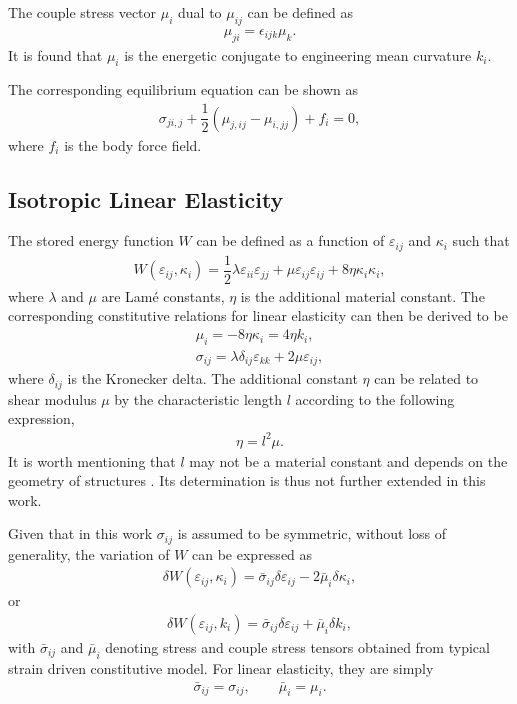 \documentclass[3p,sort&compress,11pt,fleqn,review]{elsarticle}
\begin{document}
The couple stress vector $\mu_i$ dual to $\mu_{ij}$ can be defined as
\begin{gather}
\mu_{ji}=\epsilon_{ijk}\mu_k.
\end{gather}
It is found that $\mu_i$ is the energetic conjugate to engineering mean curvature $k_i$.

The corresponding equilibrium equation can be shown as
\begin{gather}\label{eq:equilibrium}
\sigma_{ji,j}+\dfrac{1}{2}\left(\mu_{j,ij}-\mu_{i,jj}\right)+f_i=0,
\end{gather}
where $f_i$ is the body force field.
\subsection{Isotropic Linear Elasticity}
The stored energy function $W$ can be defined as a function of $\varepsilon_{ij}$ and $\kappa_i$ such that
\begin{gather}\label{eq:stored_energy}
W\left(\varepsilon_{ij},\kappa_i\right)=\dfrac{1}{2}\lambda\varepsilon_{ii}\varepsilon_{jj}+\mu\varepsilon_{ij}\varepsilon_{ij}+8\eta\kappa_i\kappa_i,
\end{gather}
where $\lambda$ and $\mu$ are Lam\'{e} constants, $\eta$ is the additional material constant. The corresponding constitutive relations for linear elasticity can then be derived to be
\begin{gather}\label{eq:constitutive_couple}
\mu_i=-8\eta\kappa_i=4\eta{}k_i,\\
\sigma_{ij}=\lambda\delta_{ij}\varepsilon_{kk}+2\mu\varepsilon_{ij},
\end{gather}
where $\delta_{ij}$ is the Kronecker delta. The additional constant $\eta$ can be related to shear modulus $\mu$ by the characteristic length $l$ according to the following expression,
\begin{gather}
\eta=l^2\mu.
\end{gather}
It is worth mentioning that $l$ may not be a material constant and depends on the geometry of structures \citep{Khorshidi2018}. Its determination is thus not further extended in this work.

Given that in this work $\sigma_{ij}$ is assumed to be symmetric, without loss of generality, the variation of $W$ can be expressed as
\begin{gather}\label{eq:potential_energy}
\delta{}W\left(\varepsilon_{ij},\kappa_i\right)=\bar{\sigma}_{ij}\delta\varepsilon_{ij}-2\bar{\mu}_{i}\delta\kappa_i,
\end{gather}
or
\begin{gather}
\delta{}W\left(\varepsilon_{ij},k_i\right)=\bar{\sigma}_{ij}\delta\varepsilon_{ij}+\bar{\mu}_{i}\delta{}k_i,
\end{gather}
with $\bar{\sigma}_{ij}$ and $\bar{\mu}_{i}$ denoting stress and couple stress tensors obtained from typical strain driven constitutive model. For linear elasticity, they are simply
\begin{gather}
\bar{\sigma}_{ij}=\sigma_{ij},\qquad\bar{\mu}_{i}=\mu_{i}.
\end{gather}
\end{document}
